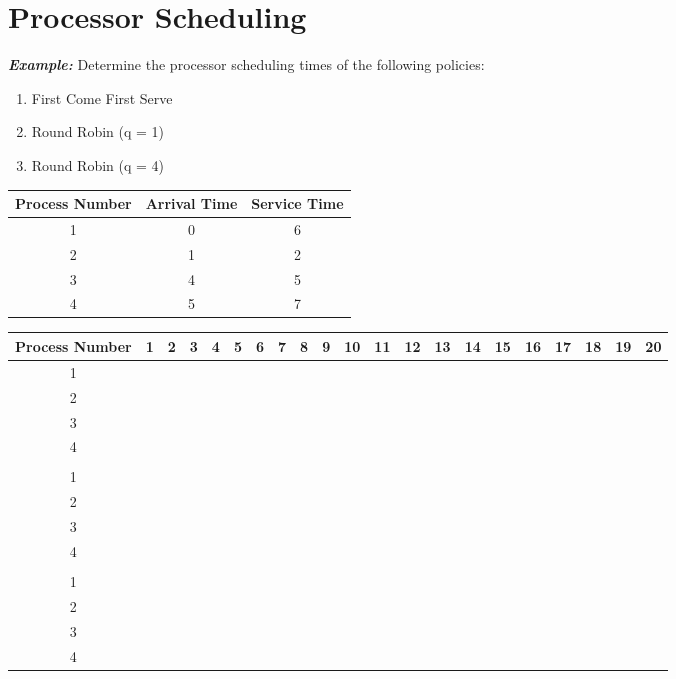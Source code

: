 \documentclass{article}
\newcommand{\generateHeader}{
\hline
Process Number & 1 & 2 & 3 & 4 & 5 & 6 & 7 & 8 & 9 & 10 & 11 & 12 & 13 & 14 & 15 & 16 & 17 & 18 & 19 & 20\\
\hline
}
\newcommand{\bc}{\cellcolor{blue!60}}
\newcommand{\blackc}{\cellcolor{black!}}
\newcommand{\blackrow}{
\blackc & \blackc & \blackc & \blackc & \blackc & \blackc & \blackc & \blackc & \blackc & \blackc & \blackc & \blackc & \blackc & \blackc & \blackc & \blackc & \blackc & \blackc & \blackc & \blackc & \blackc\\
\hline
}
\newcommand{\Example}{\textit{\textbf{Example: }}}
\begin{document}
\section{Processor Scheduling}
\Example Determine the processor scheduling times of the following policies:
\begin{enumerate}
\item First Come First Serve
\item Round Robin (q = 1)
\item Round Robin (q = 4)
\end{enumerate}
\begin{center}
\begin{tabular}{|c|c|c|}
\hline
Process Number & Arrival Time & Service Time\\
\hline
1 & 0 & 6\\
\hline
2 & 1 & 2\\
\hline
3 & 4 & 5\\
\hline
4 & 5 & 7\\
\hline
\end{tabular}

\vspace{1cm}

\begin{tabular}{|c|c|c|c|c|c|c|c|c|c|c|c|c|c|c|c|c|c|c|c|c|}
\generateHeader
1	&\bc	&\bc	&\bc	&\bc	&\bc	&\bc	&	&	&	&	&	&	&	&	&	&	&	&	&	&\\
\hline
2	&	&	&	&	&	&	&\bc &\bc &	&	&	&	&	&	&	&	&	&	&	&\\
\hline
3 	& 	& 	&	&	&	&	&	&	&\bc &\bc &\bc & \bc &\bc &	&	&	&	&	&	&\\
\hline
4	&	&	&	&	&	&	&	&	&	&	&	&	&	&\bc &\bc &\bc &\bc	&\bc	&\bc	&\bc\\
\hline
\blackrow
1	&\bc	&	&\bc	&	&\bc	&	&	&\bc	&	&	&\bc	&	&	&\bc	&	&	&	&	&	&\\
\hline
2	&	&\bc	&	&\bc	&	&	&	&	&	&	&	&	&	&	&	&	&	&	&	&\\
\hline
3	&	&	&	&	&	&\bc	&	&	&\bc	&	&	&\bc	&	&	&\bc	&	&\bc	&	&	&\\
\hline
4	&	&	&	&	&	&	&\bc	&	&	&\bc	&	&	&\bc	&	&	&\bc	&	&\bc	&\bc	&\bc\\
\hline
\blackrow
1	&\bc	&\bc	&\bc	&\bc	&	&	&	&	&	&	&\bc	&\bc	&	&	&	&	&	&	&	&\\
\hline
2	&	&	&	&	&\bc	&\bc	&	&	&	&	&	&	&	&	&	&	&	&	&	&\\
\hline
3	&	&	&	&	&	&	&\bc	&\bc	&\bc	&\bc	&	&	&	&	&	&	&\bc	&	&	&\\
\hline
4	&	&	&	&	&	&	&	&	&	&	&	&	&\bc	&\bc	&\bc	&\bc	&	&\bc	&\bc	&\bc\\
\hline
\end{tabular}
\end{center}
\newpage
\end{document}

